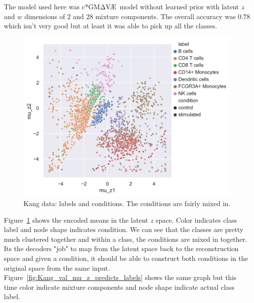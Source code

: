 \documentclass[11pt, a4paper]{report}
\theoremstyle{plain}
\theoremstyle{definition}
\theoremstyle{remark}
\newcommand{\gmvae}{c$\ast$GM$\mathrm{\Delta}$V\AE~}
\begin{document}
The model used here was \gmvae model without learned prior with latent $z$ and $w$ dimensions of $2$ and $28$
mixture components.
The overall accuracy was $0.78$ which isn't very good but at least
it was able to pick up all the classes.

\begin{figure}[h]
\centering
\includegraphics[width=1.10\textwidth]{images/Kang_val_mu_z_labels.png}
\caption{Kang data: labels and conditions. The conditions are fairly mixed in.}
\label{fig:Kang_val_mu_z_labels}
\end{figure}

Figure~\ref{fig:Kang_val_mu_z_labels} shows the encoded means in the latent $z$
space. Color indicates class label and node shape indicates condition.
We can see that the classes are pretty much clustered together and within a
class, the conditions are mixed in together. Its the decoders "job" to map from
the latent space back to the reconstruction space and given a condition, it
should be able to construct both conditions in the original space from the same
input. Figure~\ref{fig:Kang_val_mu_z_predicts_labels} shows the same graph but
this time color indicate mixture components and node shape indicate actual class
label.
\end{document}
